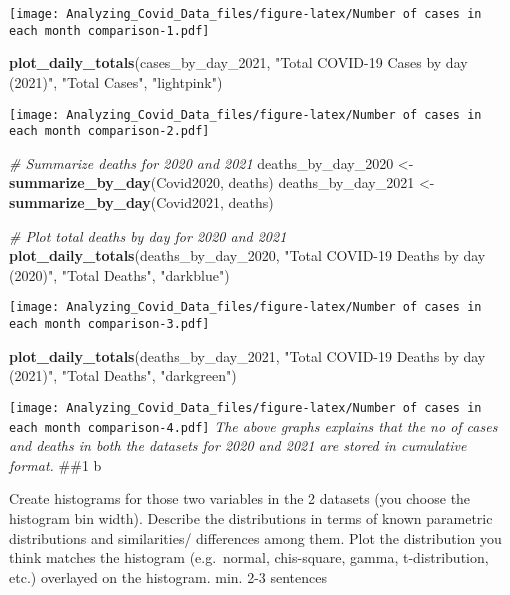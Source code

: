 \documentclass[
]{article}
\newenvironment{Shaded}{\begin{snugshade}}{\end{snugshade}}
\newcommand{\CommentTok}[1]{\textcolor[rgb]{0.56,0.35,0.01}{\textit{#1}}}
\newcommand{\FunctionTok}[1]{\textcolor[rgb]{0.13,0.29,0.53}{\textbf{#1}}}
\newcommand{\NormalTok}[1]{#1}
\newcommand{\OtherTok}[1]{\textcolor[rgb]{0.56,0.35,0.01}{#1}}
\newcommand{\StringTok}[1]{\textcolor[rgb]{0.31,0.60,0.02}{#1}}
\begin{document}
\texttt{[image: Analyzing\_Covid\_Data\_files/figure-latex/Number of cases in each month comparison-1.pdf]}

\begin{Shaded}
\begin{Highlighting}[]
\FunctionTok{plot\_daily\_totals}\NormalTok{(cases\_by\_day\_2021, }\StringTok{"Total COVID{-}19 Cases by day (2021)"}\NormalTok{, }\StringTok{"Total Cases"}\NormalTok{, }\StringTok{"lightpink"}\NormalTok{)}
\end{Highlighting}
\end{Shaded}

\texttt{[image: Analyzing\_Covid\_Data\_files/figure-latex/Number of cases in each month comparison-2.pdf]}

\begin{Shaded}
\begin{Highlighting}[]
\CommentTok{\# Summarize deaths for 2020 and 2021}
\NormalTok{deaths\_by\_day\_2020 }\OtherTok{\textless{}{-}} \FunctionTok{summarize\_by\_day}\NormalTok{(Covid2020, deaths)}
\NormalTok{deaths\_by\_day\_2021 }\OtherTok{\textless{}{-}} \FunctionTok{summarize\_by\_day}\NormalTok{(Covid2021, deaths)}

\CommentTok{\# Plot total deaths by day for 2020 and 2021}
\FunctionTok{plot\_daily\_totals}\NormalTok{(deaths\_by\_day\_2020, }\StringTok{"Total COVID{-}19 Deaths by day (2020)"}\NormalTok{, }\StringTok{"Total Deaths"}\NormalTok{, }\StringTok{"darkblue"}\NormalTok{)}
\end{Highlighting}
\end{Shaded}

\texttt{[image: Analyzing\_Covid\_Data\_files/figure-latex/Number of cases in each month comparison-3.pdf]}

\begin{Shaded}
\begin{Highlighting}[]
\FunctionTok{plot\_daily\_totals}\NormalTok{(deaths\_by\_day\_2021, }\StringTok{"Total COVID{-}19 Deaths by day (2021)"}\NormalTok{, }\StringTok{"Total Deaths"}\NormalTok{, }\StringTok{"darkgreen"}\NormalTok{)}
\end{Highlighting}
\end{Shaded}

\texttt{[image: Analyzing\_Covid\_Data\_files/figure-latex/Number of cases in each month comparison-4.pdf]}
\emph{The above graphs explains that the no of cases and deaths in both
the datasets for 2020 and 2021 are stored in cumulative format.} \#\#1 b

Create histograms for those two variables in the 2 datasets (you choose
the histogram bin width). Describe the distributions in terms of known
parametric distributions and similarities/ differences among them. Plot
the distribution you think matches the histogram (e.g.~normal,
chis-square, gamma, t-distribution, etc.) overlayed on the histogram.
min. 2-3 sentences
\end{document}
